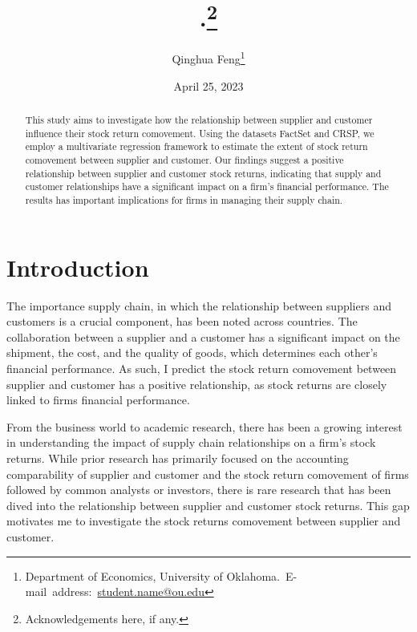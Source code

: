 \documentclass[12pt,english]{article}
\begin{document}
\begin{singlespace}
\title{.\thanks{Acknowledgements here, if any.}}
\end{singlespace}

\author{Qinghua Feng\thanks{Department of Economics, University of Oklahoma.\
E-mail~address:~\href{mailto:student.name@ou.edu}{student.name@ou.edu}}}

\date{April 25, 2023}

\maketitle

\begin{abstract}
\begin{singlespace}
This study aims to investigate how the relationship between supplier and customer influence their stock return comovement. Using the datasets FactSet and CRSP, we employ a multivariate regression framework to estimate the extent of stock return comovement between supplier and customer. Our findings suggest a positive relationship between supplier and customer stock returns, indicating that supply and customer relationships have a significant impact on a firm's financial performance. The results has important implications for firms in managing their supply chain.
\end{singlespace}

\end{abstract}
\vfill{}


\pagebreak{}


\section{Introduction}\label{sec:intro}
The importance supply chain, in which the relationship between suppliers and customers is a crucial component,  has been noted across countries. The collaboration between a supplier and a customer has a significant impact on the shipment, the cost, and the quality of goods, which determines each other's financial performance. As such, I predict the stock return comovement between supplier and customer has a positive relationship, as stock returns are closely linked to firms financial performance.

From the business world to academic research, there has been a growing interest in understanding the impact of supply chain relationships on a firm's stock returns. While prior research has primarily focused on the accounting comparability of supplier and customer and the stock return comovement of firms followed by common analysts or investors, there is rare research that has been dived into the relationship between supplier and customer stock returns. This gap motivates me to investigate the stock returns comovement between supplier and customer.
\end{document}
